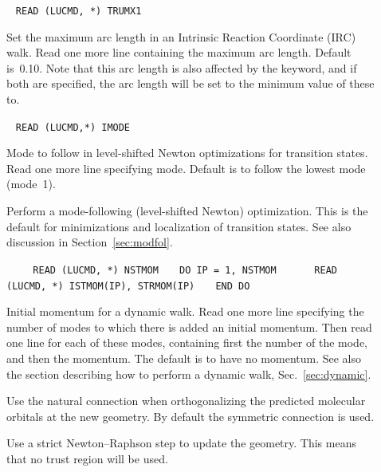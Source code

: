 \begin{description}
\item[]\verb| |\newline
\verb|READ (LUCMD, *) TRUMX1|

Set the maximum arc length in an Intrinsic Reaction Coordinate (IRC)
walk. Read one more
line containing the maximum arc length.
Default is~0.10. Note that this arc length is also affected by the
 keyword, and if both are specified, the arc length will
be set to the minimum value of these to.

\item[]\verb| |\newline
\verb|READ (LUCMD,*) IMODE|

Mode to follow in level-shifted Newton optimizations for transition
states.  Read one more line specifying
mode. Default is to follow
the lowest mode (mode~1).

\item[] Perform a mode-following (level-shifted
Newton) optimization. This is the default for minimizations and
localization of transition states. See also discussion in
Section~\ref{sec:modfol}.

\item[]\verb| |\newline
\verb|   READ (LUCMD, *) NSTMOM|\newline
\verb|   DO IP = 1, NSTMOM|\newline
\verb|      READ (LUCMD, *) ISTMOM(IP), STRMOM(IP)|\newline
\verb|   END DO|

Initial momentum for a dynamic walk.
Read one more line specifying
the number of modes to which there is added an initial momentum. Then
read one line for each of these modes, containing first the number of
the mode, and then the momentum. The default is to have no momentum.
See also the section describing how to perform a dynamic
walk, Sec.~\ref{sec:dynamic}.

\item[] Use the natural connection when orthogonalizing
the predicted molecular orbitals at the new geometry. By default the
symmetric connection is used.

\item[] Use a strict
Newton--Raphson step to update
the geometry. This means that no trust region will be used.


\end{description}
